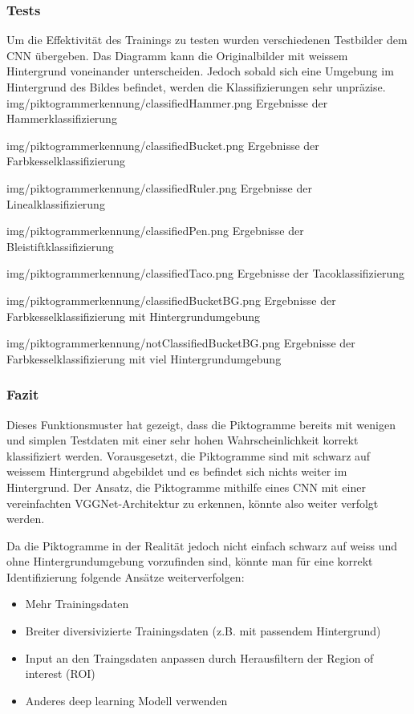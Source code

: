 \subsubsection{Tests}
Um die Effektivität des Trainings zu testen wurden verschiedenen Testbilder dem CNN übergeben. Das Diagramm kann die Originalbilder mit weissem Hintergrund voneinander unterscheiden. Jedoch sobald sich eine Umgebung im Hintergrund des Bildes befindet, werden die Klassifizierungen sehr unpräzise.
\image
   {img/piktogrammerkennung/classifiedHammer.png}
   {Ergebnisse der Hammerklassifizierung}
   
\image
   {img/piktogrammerkennung/classifiedBucket.png}
   {Ergebnisse der Farbkesselklassifizierung}
   
\image
   {img/piktogrammerkennung/classifiedRuler.png}
   {Ergebnisse der Linealklassifizierung}
   
\image
   {img/piktogrammerkennung/classifiedPen.png}
   {Ergebnisse der Bleistiftklassifizierung}
   
\image
   {img/piktogrammerkennung/classifiedTaco.png}
   {Ergebnisse der Tacoklassifizierung}

\image
   {img/piktogrammerkennung/classifiedBucketBG.png}
   {Ergebnisse der Farbkesselklassifizierung mit Hintergrundumgebung}
   
\image
   {img/piktogrammerkennung/notClassifiedBucketBG.png}
   {Ergebnisse der Farbkesselklassifizierung mit viel Hintergrundumgebung}

\subsubsection{Fazit}
Dieses Funktionsmuster hat gezeigt, dass die Piktogramme bereits mit wenigen und simplen Testdaten mit einer sehr hohen Wahrscheinlichkeit korrekt klassifiziert werden. Vorausgesetzt, die Piktogramme sind mit schwarz auf weissem Hintergrund abgebildet und es befindet sich nichts weiter im Hintergrund. Der Ansatz, die Piktogramme mithilfe eines CNN mit einer vereinfachten VGGNet-Architektur zu erkennen, könnte also weiter verfolgt werden.  

Da die Piktogramme in der Realität jedoch nicht einfach schwarz auf weiss und ohne Hintergrundumgebung vorzufinden sind, könnte man für eine korrekt Identifizierung folgende Ansätze weiterverfolgen:
\begin{itemize}
    \item Mehr Trainingsdaten
    \item Breiter diversivizierte Trainingsdaten (z.B. mit passendem Hintergrund)
    \item Input an den Traingsdaten anpassen durch Herausfiltern der Region of interest (ROI)
    \item Anderes deep learning Modell verwenden
 \end{itemize}
 
